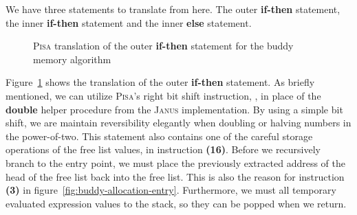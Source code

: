 We have three statements to translate from here. The outer \textbf{if-then} statement, the inner \textbf{if-then} statement and the inner \textbf{else} statement. 

\begin{figure}[ht]
    \centering
    \begin{subfigure}{.4\textwidth}
          
    \end{subfigure}
    \begin{subfigure}{.4\textwidth}
        \centering
    \end{subfigure}
    \caption{\textsc{Pisa} translation of the outer \textbf{if-then} statement for the buddy memory algorithm}
    \label{fig:pisa-buddy-outer-if}
\end{figure}

Figure~\ref{fig:pisa-buddy-outer-if} shows the translation of the outer \textbf{if-then} statement. As briefly mentioned, we can utilize \textsc{Pisa}'s right bit shift instruction, , in place of the \textbf{double} helper procedure from the \textsc{Janus} implementation. By using a simple bit shift, we are maintain reversibility elegantly when doubling or halving numbers in the power-of-two. This statement also contains one of the careful storage operations of the free list values, in instruction \textbf{(16)}. Before we recursively branch to the entry point, we must place the previously extracted address of the head of the free list back into the free list. This is also the reason for instruction \textbf{(3)} in figure~\ref{fig:buddy-allocation-entry}. Furthermore, we must all temporary evaluated expression values to the stack, so they can be popped when we return.   

